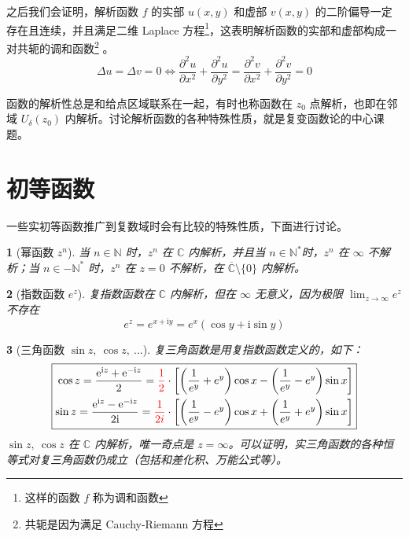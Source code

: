 \documentclass[UTF8]{report}
\def\N{\mathbb{N}}
\def\C{\mathbb{C}}
\theoremstyle{MyLineTheoremStyle} %
\theoremstyle{MyBlockTheoremStyle} %
\theoremstyle{MySubsubsectionStyle} %
\newtheorem{definition}{}
\begin{document}
    之后我们会证明，解析函数 $f$ 的实部 $u(x,y)$ 和虚部 $v(x,y)$ 的二阶偏导一定存在且连续，并且满足二维 Laplace 方程\footnote{这样的函数 $f$ 称为调和函数}，这表明解析函数的实部和虚部构成一对共轭的调和函数\footnote{共轭是因为满足 Cauchy-Riemann 方程}
    。
    \begin{equation}
        \Delta u = \Delta v = 0 \Longleftrightarrow
        \frac{\partial^{2}u}{\partial x^{2}}+\frac{\partial^{2}u}{\partial y^{2}}=\frac{\partial^{2}v}{\partial x^{2}}+\frac{\partial^{2}v}{\partial y^{2}}=0
    \end{equation}
    
    函数的解析性总是和给点区域联系在一起，有时也称函数在 $z_0$ 点解析，也即在邻域 $U_{\delta}(z_0)$ 内解析。讨论解析函数的各种特殊性质，就是复变函数论的中心课题。
    



\section{初等函数}

一些实初等函数推广到复数域时会有比较的特殊性质，下面进行讨论。



\begin{definition}[幂函数 $z^n$]
当 $n \in \N$ 时，$z^n$ 在 $\C$ 内解析，并且当 $n \in \N^*$时，$z^n$ 在 $\infty$ {\color{red} 不解析}；当 $n \in -\N^*$ 时，$z^n$ 在 $z=0$ {\color{red} 不解析}，在 $\overline{\C}\setminus \{0\}$ 内解析。
\end{definition}


\begin{definition}[指数函数 $e^z$]
复指数函数在 $\C$ 内解析，但在 $\infty$ 无意义，因为极限 $\lim_{z \to \infty}e^z$ 不存在
\begin{equation}
e^z = e^{x + \mathrm{i} y} = e^x(\cos y + \mathrm{i} \sin y)
\end{equation}
\end{definition}


\begin{definition}[三角函数 $\sin z,\ \cos z,\ ...$]
复三角函数是用复指数函数定义的，如下：
\begin{gather}
\boxed{
    \begin{aligned}
        \cos z
        =\frac{\mathrm{e}^{\mathrm{i}z}+\mathrm{e}^{-\mathrm{i}z}}{2}
        = {\color{red} \frac{1}{2}}\cdot \left[ \left( \frac{1}{e^y} + e^y \right)\cos x - \left( \frac{1}{e^y} - e^y \right)\sin x \right]
        \\
        \sin z
        =\frac{\mathrm{e}^{\mathrm{i}z}-\mathrm{e}^{-\mathrm{i}z}}{2\mathrm{i}} 
        = {\color{red} \frac{1}{2i}}\cdot \left[ \left( \frac{1}{e^y} - e^y \right)\cos x + \left( \frac{1}{e^y} + e^y \right)\sin x \right]
    \end{aligned}
}
\end{gather}
$\sin z,\ \cos z$ 在 $\C$ 内解析，唯一奇点是 $z = \infty$。可以证明，实三角函数的各种恒等式对复三角函数仍成立（包括和差化积、万能公式等）。
\end{definition}
\end{document}

